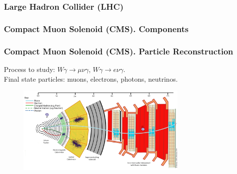 \begin{frame}\frametitle{Large Hadron Collider (LHC)}
\end{frame}%

\begin{frame}\frametitle{Compact Muon Solenoid (CMS). Components}
\begin{figure}[htb]
  \begin{center}
  \end{center}
\end{figure}
\end{frame}%


\begin{frame}\frametitle{Compact Muon Solenoid (CMS). Particle Reconstruction}
\scriptsize
Process to study: $W\gamma\rightarrow\mu\nu\gamma$, $W\gamma\rightarrow e\nu\gamma$.\\
Final state particles: muons, electrons, photons, neutrinos.\\
\begin{figure}[htb]
  \begin{center}
    {\includegraphics[width=0.75\textwidth]{../figs/Exp/CMS_Slice.png}}
  \end{center}
\end{figure}

\end{frame}%

